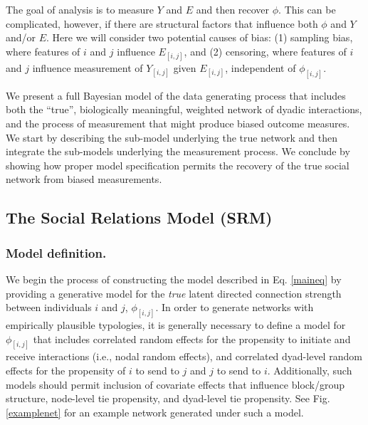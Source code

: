 \documentclass[Afour,sageh,times]{sagej}
\begin{document}
The goal of analysis is to measure $Y$ and $E$ and then recover $\phi$. This can be complicated, however, if there are structural factors that influence both $\phi$ and $Y$ and/or $E$. Here we will consider two potential causes of bias: (1) sampling bias, where features of $i$ and $j$ influence $E_{[i,j]}$, and (2) censoring, where features of $i$ and $j$ influence measurement of $Y_{[i,j]}$ given $E_{[i,j]}$, independent of $\phi_{[i,j]}$. 

We present a full Bayesian model of the data generating process that includes both the ``true'', biologically meaningful, weighted network of dyadic interactions, and the process of measurement that might produce biased outcome measures. We start by describing the sub-model underlying the true network and then integrate the sub-models underlying the measurement process. We conclude by showing how proper model specification permits the recovery of the true social network from biased measurements.

\subsection{The Social Relations Model (SRM)}
\subsubsection{Model definition.}

We begin the process of constructing the model described in Eq. \ref{maineq} by providing a generative model for the \emph{true} latent directed connection strength between individuals $i$ and $j$, $\phi_{[i,j]}$. In order to generate networks with empirically plausible typologies, it is generally necessary to define a model for $\phi_{[i,j]}$ that includes correlated random effects for the propensity to initiate and receive interactions (i.e., nodal random effects), and correlated dyad-level random effects for the propensity of $i$ to send to $j$ and $j$ to send to $i$. Additionally, such models should permit inclusion of covariate effects that influence block/group structure, node-level tie propensity, and dyad-level tie propensity. See Fig. \ref{examplenet} for an example network generated under such a model. 
\end{document}

